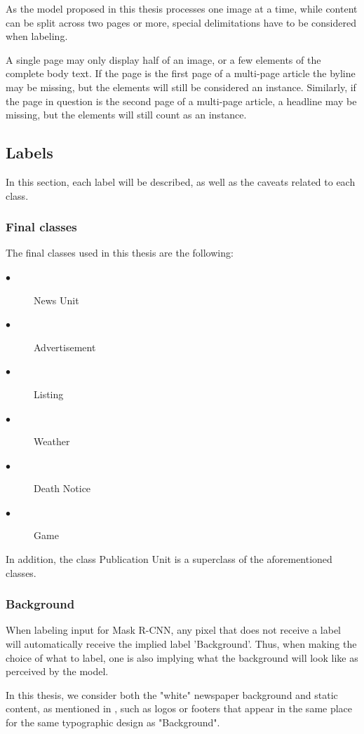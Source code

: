 \documentclass[oneside, english, bibtex]{kththesis}
\begin{document}
As the model proposed in this thesis processes one image at a time, while content can be split across two pages or more, special delimitations have to be considered when labeling.

A single page may only display half of an image, or a few elements of the complete body text.
If the page is the first page of a multi-page article the byline may be missing, but the elements will still be considered an instance.
Similarly, if the page in question is the second page of a multi-page article, a headline may be missing, but the elements will still count as an instance.

\subsection{Labels}

In this section, each label will be described, as well as the caveats related to each class.


\subsubsection{Final classes}
\label{subs:finalclasses}

The final classes used in this thesis are the following:

\begin{description}
\item[$\bullet$] News Unit
\item[$\bullet$] Advertisement
\item[$\bullet$] Listing
\item[$\bullet$] Weather
\item[$\bullet$] Death Notice
\item[$\bullet$] Game
\end{description}

In addition, the class Publication Unit is a superclass of the aforementioned classes.

\subsubsection{Background}

When labeling input for Mask R-CNN, any pixel that does not receive a label will automatically receive the implied label 'Background'.
Thus, when making the choice of what to label, one is also implying what the background will look like as perceived by the model.

In this thesis, we consider both the "white" newspaper background and static content, as mentioned in , such as logos or footers that appear in the same place for the same typographic design as "Background".
\end{document}
